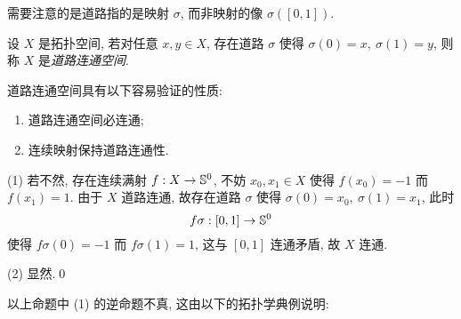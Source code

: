     需要注意的是道路指的是映射 $ \sigma $, 而非映射的像 $ \sigma([0,1]) $.

    \begin{Definition}[道路连通空间]
        设 $ X $ 是拓扑空间, 若对任意 $ x,y\in X $, 存在道路 $ \sigma $ 使得 $ \sigma(0)=x,\ \sigma(1)=y $, 则称 $ X $ 是\emph{道路连通空间}.
    \end{Definition}
    
    \begin{Proposition}
        道路连通空间具有以下容易验证的性质:
        \begin{enumerate}
            \item 道路连通空间必连通;
            \item 连续映射保持道路连通性.
        \end{enumerate}
    \end{Proposition}
    \begin{Proof}
        (1) 若不然, 存在连续满射 $ f : X\to\S^0 $, 不妨 $ x_0,x_1\in X $ 使得 $ f(x_0)=-1 $ 而 $ f(x_1)=1 $. 由于 $ X $ 道路连通, 故存在道路 $ \sigma $ 使得 $ \sigma(0)=x_0,\ \sigma(1)=x_1 $, 此时
        \[
            f\sigma : [0,1]\to\S^0
        \]
        使得 $ f\sigma(0)=-1 $ 而 $ f\sigma(1)=1 $, 这与 $ [0,1] $ 连通矛盾, 故 $ X $ 连通.

        (2) 显然.\qed
    \end{Proof}

    以上命题中 (1) 的逆命题不真, 这由以下的拓扑学典例说明:

